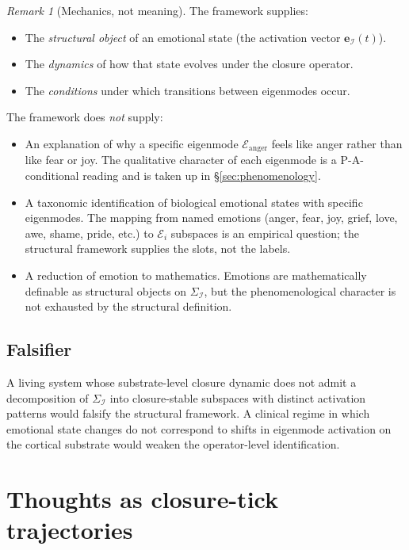 \documentclass[11pt]{article}
\theoremstyle{plain}
\theoremstyle{definition}
\theoremstyle{remark}
\newtheorem{remark}[theorem]{Remark}
\newcommand{\Ical}{\mathcal{I}}
\begin{document}
\begin{remark}[Mechanics, not meaning]\label{rem:emotion-discipline}
The framework supplies:
\begin{itemize}[leftmargin=2em]
\item The \emph{structural object} of an emotional state (the activation vector $\mathbf{e}_\Ical(t)$).
\item The \emph{dynamics} of how that state evolves under the closure operator.
\item The \emph{conditions} under which transitions between eigenmodes occur.
\end{itemize}
The framework does \emph{not} supply:
\begin{itemize}[leftmargin=2em]
\item An explanation of why a specific eigenmode $\mathcal{E}_{\mathrm{anger}}$ feels like anger rather than like fear or joy. The qualitative character of each eigenmode is a P-A-conditional reading and is taken up in \S\ref{sec:phenomenology}.
\item A taxonomic identification of biological emotional states with specific eigenmodes. The mapping from named emotions (anger, fear, joy, grief, love, awe, shame, pride, etc.) to $\mathcal{E}_i$ subspaces is an empirical question; the structural framework supplies the slots, not the labels.
\item A reduction of emotion to mathematics. Emotions are mathematically definable as structural objects on $\Sigma_\Ical$, but the phenomenological character is not exhausted by the structural definition.
\end{itemize}
\end{remark}

\subsection{Falsifier}

A living system whose substrate-level closure dynamic does not admit a decomposition of $\Sigma_\Ical$ into closure-stable subspaces with distinct activation patterns would falsify the structural framework. A clinical regime in which emotional state changes do not correspond to shifts in eigenmode activation on the cortical substrate would weaken the operator-level identification.

\section{Thoughts as closure-tick trajectories}\label{sec:thoughts}
\end{document}
